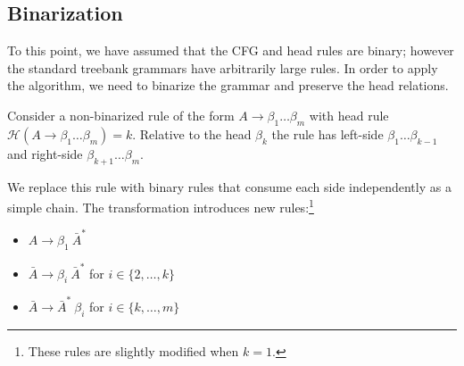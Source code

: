 \documentclass[11pt,letterpaper]{article}
\newcommand{\rules}{\mathcal{R}}
\newcommand{\Rule}[3]{#1 \rightarrow #2\ #3}
\newcommand{\RuleA}[3]{#1 \rightarrow #2^*\ #3}
\newcommand{\lpkcomment}[1]{\textcolor{red}{\bf \small [#1 --lpk]}}
\begin{document}
\subsection{Binarization}


To this point, we have assumed that the CFG and head rules are binary;
however the standard treebank grammars have arbitrarily large rules.
In order to apply the algorithm, we need to binarize the grammar and
 preserve the head relations.  

 Consider a non-binarized rule of the form $ A \rightarrow \beta_1
 \ldots \beta_m$ with head rule $\mathcal{H}(A \rightarrow \beta_1
 \ldots \beta_m) = k$. Relative to the head $\beta_k$ the rule has
 left-side $\beta_1 \ldots \beta_{k-1}$ and right-side $\beta_{k+1}
 \ldots \beta_m$.




We replace this rule with binary rules that consume each side
independently as a simple chain.
The transformation introduces new rules:\footnote{These rules are slightly modified when $k=1$.}

\begin{itemize}
\item
$\Rule{A}{\beta_1}{\bar{A}^{*}}$ 
\item
$\Rule{\bar{A}} {\beta_i}{\bar{A}^{*}} $ for $i \in \{2, \ldots, k\}$
\item
$\Rule{\bar{A}}{\bar{A}^{*}}{\beta_i}$ for $i \in \{k, \ldots, m\}$
\end{itemize}


\end{document}

